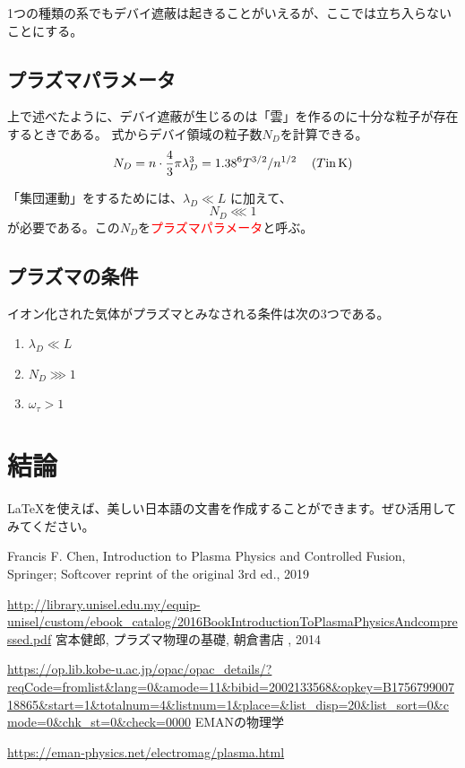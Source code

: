 \documentclass{ltjsarticle}
\numberwithin{equation}{section} %
\begin{document}
1つの種類の系でもデバイ遮蔽は起きることがいえるが、ここでは立ち入らないことにする。

\subsection{プラズマパラメータ}
上で述べたように、デバイ遮蔽が生じるのは「雲」を作るのに十分な粒子が存在するときである。
式からデバイ領域の粒子数$N_D$を計算できる。
\begin{equation}
  N_D = n\cdot \frac{4}{3}\pi \lambda_D ^3 = 1.38 \time 10^6T^{3/2}/n^{1/2} \hspace{1pc}(T\text{in}\, \si{\kelvin})
\end{equation}

「集団運動」をするためには、$\lambda_D \ll L$ に加えて、
\begin{equation}
  N_D \lll 1
\end{equation}
が必要である。この$N_D$を\textcolor{red}{プラズマパラメータ}と呼ぶ。

\subsection{プラズマの条件}
イオン化された気体がプラズマとみなされる条件は次の3つである。
\begin{enumerate}
  \item $\lambda_D \ll L$
  \item $N_D \ggg 1$
  \item $\omega_\tau > 1$
\end{enumerate}









\section{結論}
LaTeXを使えば、美しい日本語の文書を作成することができます。ぜひ活用してみてください。




\begin{thebibliography}{99}
 Francis F. Chen, Introduction to Plasma Physics and Controlled Fusion, Springer; Softcover reprint of the original 3rd ed., 2019\par
\url{http://library.unisel.edu.my/equip-unisel/custom/ebook_catalog/2016BookIntroductionToPlasmaPhysicsAndcompressed.pdf}
 宮本健郎, プラズマ物理の基礎, 朝倉書店 , 2014\par
\url{https://op.lib.kobe-u.ac.jp/opac/opac_details/?reqCode=fromlist&lang=0&amode=11&bibid=2002133568&opkey=B175679900718865&start=1&totalnum=4&listnum=1&place=&list_disp=20&list_sort=0&cmode=0&chk_st=0&check=0000}
 EMANの物理学\par
\url{https://eman-physics.net/electromag/plasma.html}
\end{thebibliography}
\end{document}
